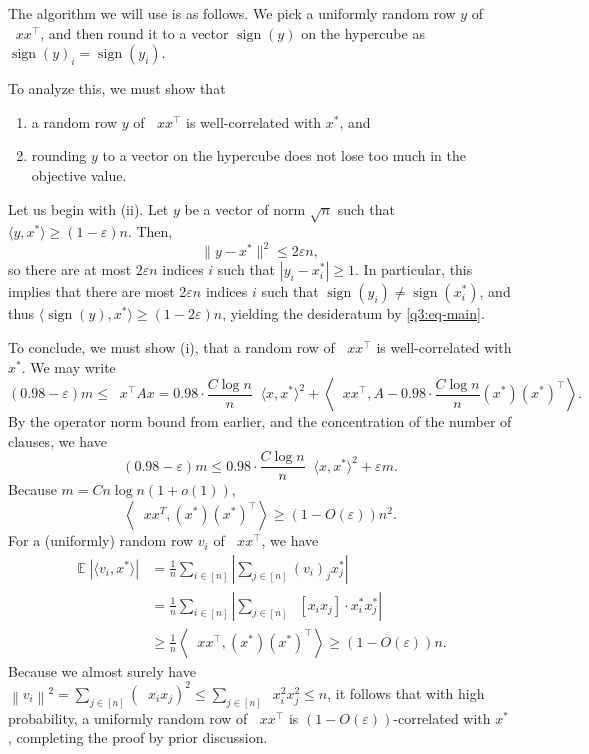 \documentclass[11pt]{article}
\theoremstyle{definition}
\newcommand{\norm}[1]{\left\| #1 \right\|}
\renewcommand{\epsilon}{\varepsilon}
\newcommand{\eps}{\epsilon}
\DeclareMathOperator{\E}{\mathbb{E}} %
\DeclareMathOperator{\pE}{\widetilde{\mathbb{E}}} %
\newcommand{\sgn}{\operatorname{sign}}
\begin{document}
\begin{enumerate}[label=(\alph*)]
    The algorithm we will use is as follows. We pick a uniformly random row $y$ of $\pE xx^\top$, and then round it to a vector $\sgn(y)$ on the hypercube as $\sgn(y)_i = \sgn(y_i)$.

    To analyze this, we must show that
    \begin{enumerate}[label=(\roman*)]
      \item a random row $y$ of $\pE xx^\top$ is well-correlated with $x^*$, and
      \item rounding $y$ to a vector on the hypercube does not lose too much in the objective value.
    \end{enumerate}

    Let us begin with (ii). Let $y$ be a vector of norm $\sqrt{n}$ such that $\langle y,x^*\rangle \ge (1-\eps) n$. Then,
    \[ \|y-x^*\|^2 \le 2\eps n, \]
    so there are at most $2\eps n$ indices $i$ such that $|y_i - x_i^*| \ge 1$. In particular, this implies that there are most $2\eps n$ indices $i$ such that $\sgn(y_i) \ne \sgn(x_i^*)$, and thus $\langle \sgn(y) , x^* \rangle \ge (1-2\eps)n$, yielding the desideratum by \eqref{q3:eq-main}. 

    To conclude, we must show (i), that a random row of $\pE xx^\top$ is well-correlated with $x^*$. We may write
    \begin{equation}
      \label{eq:q3-high-corr}
      (0.98-\eps) m \le \pE x^\top A x = 0.98 \cdot \frac{C \log n}{n} \pE \langle x , x^* \rangle^2 + \left\langle \pE xx^\top , A - 0.98 \cdot \frac{C\log n}{n} (x^*)(x^*)^\top \right\rangle.
    \end{equation}
    By the operator norm bound from earlier, and the concentration of the number of clauses, we have
    \[ (0.98 - \eps) m \le 0.98 \cdot \frac{C \log n}{n} \pE \langle x,x^*\rangle^2 + \eps m. \]
    Because $m = C n \log n (1+o(1))$,
    \[ \left\langle \pE xx^T , (x^*)(x^*)^\top \right\rangle \ge (1-O(\eps))n^2. \]
    For a (uniformly) random row $v_i$ of $\pE xx^\top$, we have
    \begin{align*}
      \E |\langle v_i , x^*\rangle| &= \frac{1}{n} \sum_{i \in [n]} \left| \sum_{j \in [n]} (v_i)_j x^*_j \right| \\
        &= \frac{1}{n} \sum_{i \in [n]} \left| \sum_{j \in [n]} \pE [x_i x_j] \cdot x^*_i x^*_j \right| \\
        &\ge \frac{1}{n} \left\langle \pE xx^\top , (x^*)(x^*)^\top \right\rangle \ge (1-O(\eps))n.
    \end{align*}
    Because we almost surely have $\norm{v_i}^2 = \sum_{j \in [n]} \left(\pE x_ix_j\right)^2 \le \sum_{j \in [n]} \pE x_i^2 x_j^2 \le n$, it follows that with high probability, a uniformly random row of $\pE xx^\top$ is $(1-O(\eps))$-correlated with $x^*$, completing the proof by prior discussion.


  \end{enumerate}
\end{document}
